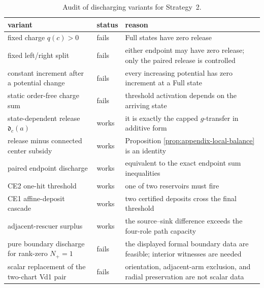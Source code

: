 \begin{table}[H]
\centering
\scriptsize
\renewcommand{\arraystretch}{1.12}
\begin{tabular}{@{}p{}p{}p{}@{}}
\toprule
variant&status&reason\\
\midrule
fixed charge \(q(c)>0\)&fails&Full states have zero release\\
fixed left/right split&fails&either endpoint may have zero release; only the
paired release is controlled\\
constant increment after a potential change&fails&every increasing potential
has zero increment at a Full state\\
static order-free charge sum&fails&threshold activation depends on the arriving
state\\
state-dependent release \(\mathfrak d_c(a)\)&works&it is exactly the capped
\(g\)-transfer in additive form\\
release minus connected center subsidy&works&Proposition
\ref{prop:appendix-local-balance} is an identity\\
paired endpoint discharge&works&equivalent to the exact endpoint sum
inequalities\\
CE2 one-hit threshold&works&one of two reservoirs must fire\\
CE1 affine-deposit cascade&works&two certified deposits cross the final
threshold\\
adjacent-rescuer surplus&works&the source--sink difference exceeds the
four-role path capacity\\
pure boundary discharge for rank-zero \(N_+=1\)&fails&the displayed formal
boundary data are feasible; interior witnesses are needed\\
scalar replacement of the two-chart Vd1 pair&fails&orientation, adjacent-arm
exclusion, and radial preservation are not scalar data\\
\bottomrule
\end{tabular}
\caption{Audit of discharging variants for Strategy~2.}
\label{tab:appendix-discharging-audit}
\end{table}
